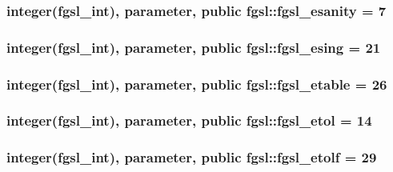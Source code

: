 \subsubsection[{fgsl\+\_\+esanity}]{\setlength{\rightskip}{0pt plus 5cm}integer({\bf fgsl\+\_\+int}), parameter, public fgsl\+::fgsl\+\_\+esanity = 7}\label{namespacefgsl_a9dc60d8f0ce30b7b328d703d09a0e987}
\hypertarget{namespacefgsl_aeb4c28b199599ec4c17ff7330a4ad10d}{}
\subsubsection[{fgsl\+\_\+esing}]{\setlength{\rightskip}{0pt plus 5cm}integer({\bf fgsl\+\_\+int}), parameter, public fgsl\+::fgsl\+\_\+esing = 21}\label{namespacefgsl_aeb4c28b199599ec4c17ff7330a4ad10d}
\hypertarget{namespacefgsl_ac1348341f3d95b02f852466ca383d1ae}{}
\subsubsection[{fgsl\+\_\+etable}]{\setlength{\rightskip}{0pt plus 5cm}integer({\bf fgsl\+\_\+int}), parameter, public fgsl\+::fgsl\+\_\+etable = 26}\label{namespacefgsl_ac1348341f3d95b02f852466ca383d1ae}
\hypertarget{namespacefgsl_a7e4da7bbb4435c2bceff8cf57d554015}{}
\subsubsection[{fgsl\+\_\+etol}]{\setlength{\rightskip}{0pt plus 5cm}integer({\bf fgsl\+\_\+int}), parameter, public fgsl\+::fgsl\+\_\+etol = 14}\label{namespacefgsl_a7e4da7bbb4435c2bceff8cf57d554015}
\hypertarget{namespacefgsl_a9b3ff0443a3c8e9570d06e762b1ca241}{}
\subsubsection[{fgsl\+\_\+etolf}]{\setlength{\rightskip}{0pt plus 5cm}integer({\bf fgsl\+\_\+int}), parameter, public fgsl\+::fgsl\+\_\+etolf = 29}\label{namespacefgsl_a9b3ff0443a3c8e9570d06e762b1ca241}
\hypertarget{namespacefgsl_a12d84e3678cb637e43f1a7a888558110}{}
